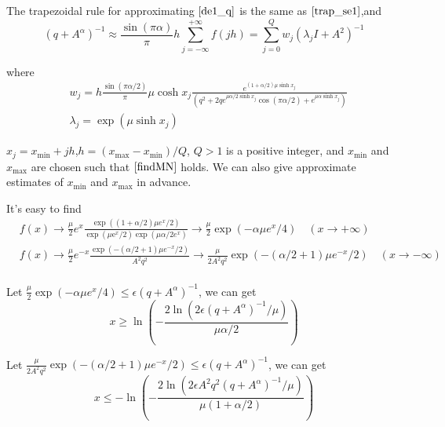 The trapezoidal rule for approximating $\eqref{de1_q} $ is the same as $\eqref{trap_se1}$,and
\begin{equation}
	(q+{A}^{\alpha})^{-1}\approx \frac{\sin(\pi \alpha)}{\pi} h\sum_{j=-\infty}^{+\infty} f(jh)=\sum_{j=0}^{Q}w_j(\lambda_jI+A^2)^{-1}
	\label{DE1_q}
\end{equation}

where
\begin{equation}
	\begin{aligned}
		&w_j=h\frac{\sin(\pi \alpha/2)}{\pi}\mu\cosh x_j\frac{e^{(1+\alpha/2)\mu\sinh x_j }}{(q^2+2q e^{\mu \alpha/2 \sinh x_j}\cos(\pi\alpha/2)+e^{\mu\alpha\sinh x_j})}\\
		&\lambda_j=\exp(\mu\sinh x_j)
	\end{aligned}
\label{lw_DE1_q}
\end{equation}

$x_j=x_{\min}+jh$,$h=(x_{\max}-x_{\min})/Q$, $Q>1$ is a positive integer, and $x_{\min}$ and $x_{\max}$ are chosen such that $\eqref{findMN}$ holds. We can also give approximate estimates of $x_{\min}$ and $x_{\max}$ in advance.

It's easy to find
\begin{equation}
	\begin{aligned}
		& f\left( x \right) \rightarrow
		\frac{\mu}{2}e^x\frac{\exp \left( \left( 1+\alpha/2 \right) \mu e^x/2 \right)}{\exp \left( \mu \text{e}^x/2 \right)\exp(\mu \alpha/2 e^x)}
		\rightarrow \frac{\mu}{2}\exp \left(  -\alpha \mu e^x /4\right)
		\quad (x \rightarrow +\infty)\\
		& f\left( x \right) \rightarrow 	 \frac{\mu}{2} e^{-x} \frac{\exp \left(-(\alpha/2+1)\mu e^{-x}/2\right)}{A^2q^2} \rightarrow
		\frac{\mu}{2 A^2q^2}  \exp \left(-(\alpha/2+1)\mu e^{-x}/2\right)
		\quad (x \rightarrow -\infty)\\
	\end{aligned}
	\label{AS_DE1}
\end{equation}

Let $\frac{\mu}{2}\exp \left(  -\alpha \mu e^x /4\right) \leq \epsilon  (q+{A}^{\alpha})^{-1}$, we can get
\begin{equation}
	x\geq \ln\left(-\frac{2\ln(2\epsilon  (q+{A}^{\alpha})^{-1}/\mu)}{\mu \alpha/2}\right)
\end{equation}

Let $\frac{\mu}{2 A^2q^2}  \exp \left(-(\alpha/2+1)\mu e^{-x}/2\right) \leq \epsilon  (q+{A}^{\alpha})^{-1}$, we can get
\begin{equation}
	x\leq -\ln\left(-\frac{2\ln(2\epsilon A^2 q^2  (q+{A}^{\alpha})^{-1}/\mu)}{\mu(1+\alpha/2)}\right)
\end{equation}

